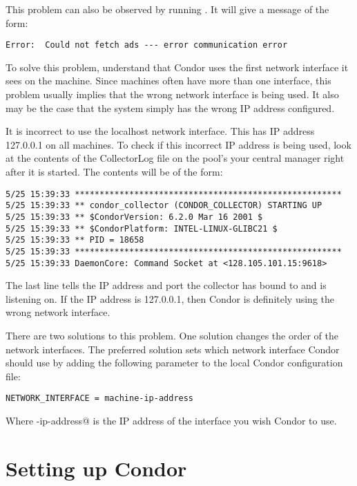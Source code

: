 This problem can also be observed by running .
It will give a message of the form:
\begin{verbatim}
Error:  Could not fetch ads --- error communication error
\end{verbatim}

To solve this problem, understand that
Condor uses the first network interface it sees on the machine.
Since machines often have more than one interface,
this problem usually implies that the wrong network
interface is being used.  It also may be the case that
the system simply has the wrong IP address configured.

It is incorrect to use the localhost network interface.
This has IP address 127.0.0.1 on all machines.
To check if this incorrect IP address is being used,
look at the contents of the
CollectorLog file on the pool's
your central manager right after it is started.  
The contents will be of the form:

\begin{verbatim}
5/25 15:39:33 ******************************************************
5/25 15:39:33 ** condor_collector (CONDOR_COLLECTOR) STARTING UP
5/25 15:39:33 ** $CondorVersion: 6.2.0 Mar 16 2001 $
5/25 15:39:33 ** $CondorPlatform: INTEL-LINUX-GLIBC21 $
5/25 15:39:33 ** PID = 18658
5/25 15:39:33 ******************************************************
5/25 15:39:33 DaemonCore: Command Socket at <128.105.101.15:9618>
\end{verbatim}

The last line tells the IP address and port the collector has
bound to and is listening on.
If the IP address is 127.0.0.1, then Condor is definitely using the wrong
network interface.

There are two solutions to this problem.
One solution changes the order of the network interfaces.
The preferred solution
sets which network interface Condor should use
by adding the following parameter to the
local Condor configuration file:

\begin{verbatim}NETWORK_INTERFACE = machine-ip-address\end{verbatim}

Where \verb@machine-ip-address@ is the IP address of the interface you wish
Condor to use.


\section{Setting up Condor}

